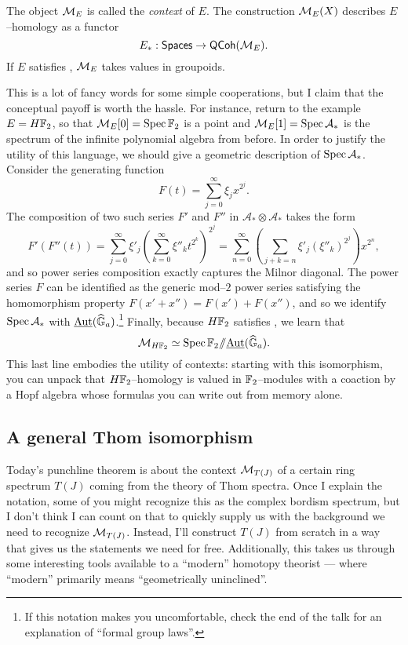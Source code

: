 \begin{definition}
The object $\mathcal{M}_E$ is called the \textit{context} of $E$.  The construction $\mathcal{M}_E(X)$ describes $E$--homology as a functor \[E_*: \mathsf{Spaces} \to \mathsf{QCoh}(\mathcal{M}_E).\]  If $E$ satisfies \FH, $\mathcal{M}_E$ takes values in groupoids.
\end{definition}

This is a lot of fancy words for some simple cooperations, but I claim that the conceptual payoff is worth the hassle.  For instance, return to the example $E = H\mathbb F_2$, so that $\mathcal{M}_E[0] = \operatorname{Spec} \mathbb F_2$ is a point and $\mathcal{M}_E[1] = \operatorname{Spec} \mathcal A_*$ is the spectrum of the infinite polynomial algebra from before.  In order to justify the utility of this language, we should give a geometric description of $\operatorname{Spec} \mathcal A_*$.  Consider the generating function \[F(t) = \sum_{j=0}^\infty \xi_j x^{2^j}.\]  The composition of two such series $F'$ and $F''$ in $\mathcal A_* \otimes \mathcal A_*$ takes the form \[F'(F''(t)) = \sum_{j=0}^\infty \xi'_j \left(\sum_{k=0}^\infty \xi''_k t^{2^k} \right)^{2^j} = \sum_{n=0}^\infty \left( \sum_{j+k=n} \xi'_j (\xi''_k)^{2^j} \right) x^{2^n},\] and so power series composition exactly captures the Milnor diagonal.  The power series $F$ can be identified as the generic mod--$2$ power series satisfying the homomorphism property $F(x' + x'') = F(x') + F(x'')$, and so we identify $\operatorname{Spec} \mathcal A_*$ with $\underline{\operatorname{Aut}}(\widehat{\mathbb G}_a)$.\footnote{If this notation makes you uncomfortable, check the end of the talk for an explanation of ``formal group laws''.}  Finally, because $H\mathbb F_2$ satisfies \FH, we learn that \[\mathcal{M}_{H\mathbb F_2} \simeq \operatorname{Spec} \mathbb F_2 /\!\!/ \underline{\operatorname{Aut}}(\widehat{\mathbb G}_a).\]  This last line embodies the utility of contexts: starting with this isomorphism, you can unpack that $H\mathbb F_2$--homology is valued in $\mathbb F_2$--modules with a coaction by a Hopf algebra whose formulas you can write out from memory alone.




\subsection*{A general Thom isomorphism}

Today's punchline theorem is about the context $\mathcal{M}_{T(J)}$ of a certain ring spectrum $T(J)$ coming from the theory of Thom spectra.  Once I explain the notation, some of you might recognize this as the complex bordism spectrum, but I don't think I can count on that to quickly supply us with the background we need to recognize $\mathcal{M}_{T(J)}$.  Instead, I'll construct $T(J)$ from scratch in a way that gives us the statements we need for free.  Additionally, this takes us through some interesting tools available to a ``modern'' homotopy theorist --- where ``modern'' primarily means ``geometrically uninclined''.

